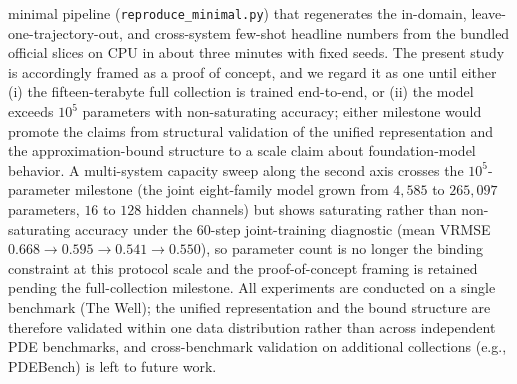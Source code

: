\documentclass[preprint,12pt]{elsarticle}
\begin{document}
minimal pipeline (\texttt{reproduce\_minimal.py}) that regenerates the in-domain,
leave-one-trajectory-out, and cross-system few-shot headline numbers from the bundled official
slices on CPU in about three minutes with fixed seeds.
The present study is accordingly framed as a proof of concept, and we regard it as one until
either (i) the fifteen-terabyte full collection is trained end-to-end, or (ii) the model exceeds
$10^{5}$ parameters with non-saturating accuracy; either milestone would promote the claims from
structural validation of the unified representation and the approximation-bound structure to a
scale claim about foundation-model behavior. A multi-system capacity sweep along the second axis
crosses the $10^{5}$-parameter milestone (the joint eight-family model grown from $4{,}585$ to
$265{,}097$ parameters, $16$ to $128$ hidden channels) but shows saturating rather than
non-saturating accuracy under the 60-step joint-training diagnostic (mean VRMSE
$0.668\to0.595\to0.541\to0.550$), so parameter count is no longer the binding constraint at this
protocol scale and the proof-of-concept framing is retained pending the full-collection milestone.
All experiments are conducted on a single benchmark (The Well); the unified representation and the
bound structure are therefore validated within one data distribution rather than across independent
PDE benchmarks, and cross-benchmark validation on additional collections (e.g., PDEBench) is left
to future work.
\end{document}

